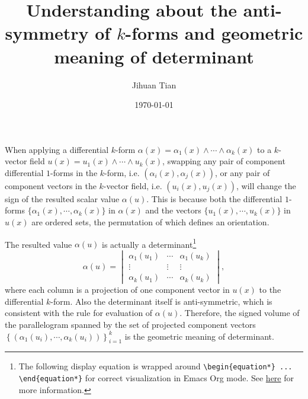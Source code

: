 \documentclass[11pt]{article}
\author{Jihuan Tian}
\date{\today}
\title{Understanding about the anti-symmetry of \(k\)-forms and geometric meaning of determinant}
\begin{document}
\maketitle
\setcounter{tocdepth}{5}
\tableofcontents

When applying a differential \(k\)-form \(\alpha(x) = \alpha_1(x) \wedge \cdots \wedge \alpha_k(x)\) to a \(k\)-vector field \(u(x) = u_1(x) \wedge \cdots \wedge u_k(x)\), swapping any pair of component differential \(1\)-forms in the \(k\)-form, i.e. \((\alpha_i(x), \alpha_j(x))\), or any pair of component vectors in the \(k\)-vector field, i.e. \((u_i(x), u_j(x))\), will change the sign of the resulted scalar value \(\alpha(u)\). This is because both the differential \(1\)-forms \(\{\alpha_1(x), \cdots, \alpha_k(x)\}\) in \(\alpha(x)\) and the vectors \(\{u_1(x), \cdots, u_k(x)\}\) in \(u(x)\) are ordered sets, the permutation of which defines an orientation.

The resulted value \(\alpha(u)\) is actually a determinant\footnote{The following display equation is wrapped around \texttt{\textbackslash{}begin\{equation*\} ... \textbackslash{}end\{equation*\}} for correct visualization in Emacs Org mode. See \href{emacs.org}{here} for more information.}
\begin{equation*}
\alpha(u) = 
\begin{vmatrix}
\alpha_1(u_1) & \cdots & \alpha_1(u_k) \\
\vdots & \vdots & \vdots \\
\alpha_k(u_1) & \cdots & \alpha_k(u_k)
\end{vmatrix},
\end{equation*}
where each column is a projection of one component vector in \(u(x)\) to the differential \(k\)-form. Also the determinant itself is anti-symmetric, which is consistent with the rule for evaluation of \(\alpha(u)\). Therefore, the signed volume of the parallelogram spanned by the set of projected component vectors \(\left\{ (\alpha_1(u_i), \cdots, \alpha_k(u_i)) \right\}_{i=1}^{k}\) is the geometric meaning of determinant.
\end{document}
